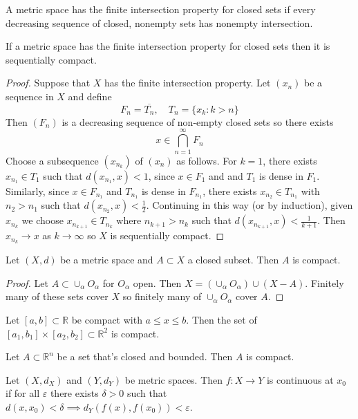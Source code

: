 \documentclass{article}
\newcommand{\R}{\mathbb{R}}
\newcommand{\eps}{\varepsilon}
\newcommand{\ra}[1][]{\xrightarrow{#1}}
\begin{document}
\begin{definition}
A metric space has the finite intersection property for closed sets if every decreasing sequence of closed, nonempty sets has nonempty intersection.
\end{definition}
\begin{lemma}
If a metric space has the finite intersection property for closed sets then it is sequentially compact.
\end{lemma}
\begin{proof}
Suppose that $X$ has the finite intersection property. Let $(x_n)$ be a sequence in $X$ and define $$F_n=\overline{T_n},\quad T_n=\{x_k:k>n\}$$ Then $(F_n)$ is a decreasing sequence of non-empty closed sets so there exists $$x\in \bigcap_{n=1}^\infty F_n$$ Choose a subsequence $(x_{n_k})$ of $(x_n)$ as follows. For $k=1$, there exists $x_{n_1}\in T_1$ such that $d(x_{n_1},x)<1$, since $x\in F_1$ and and $T_1$ is dense in $F_1$. Similarly, since $x\in F_{n_1}$ and $T_{n_1}$ is dense in $F_{n_1}$, there exists $x_{n_2}\in T_{n_1}$ with $n_2>n_1$ such that $d(x_{n_2},x)<\frac{1}{2}.$ Continuing in this way (or by induction), given $x_{n_k}$ we choose $x_{n_{k+1}}\in T_{n_k}$ where $n_{k+1}>n_k$ such that $d(x_{n_{k+1}},x)<\frac{1}{k+1}.$ Then $x_{n_k}\ra x$ as $k\ra \infty$ so $X$ is sequentially compact.
\end{proof}
\begin{lemma}
Let $(X,d)$ be a metric space and $A\subset X$ a closed subset. Then $A$ is compact.
\end{lemma}
\begin{proof}
Let $A\subset \cup_\alpha O_\alpha$ for $O_\alpha$ open. Then $X=(\cup_\alpha O_\alpha)\cup (X-A)$. Finitely many of these sets cover $X$ so finitely many of $\cup_\alpha O_\alpha$ cover $A$.
\end{proof}
\begin{theorem}
Let $[a,b]\subset \R$ be compact with $a\leq x\leq b$. Then the set of $[a_1,b_1]\times [a_2,b_2]\subset \R^2$ is compact.
\end{theorem}
\begin{corollary}
Let $A\subset \R^n$ be a set that's closed and bounded. Then $A$ is compact.
\end{corollary}
\begin{definition}
Let $(X,d_X)$ and $(Y,d_Y)$ be metric spaces. Then $f:X\ra Y$ is continuous at $x_0$ if for all $\eps$ there exists $\delta>0$ such that $d(x,x_0)<\delta\implies d_Y(f(x),f(x_0))<\eps$.
\end{definition}
\end{document}
